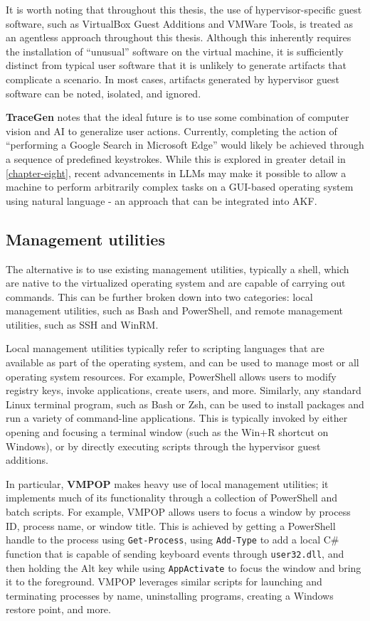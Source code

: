 \documentclass[letterpaper,12pt]{report}
\newcommand{\passthrough}[1]{#1}
\begin{document}
It is worth noting that throughout this thesis, the use of
hypervisor-specific guest software, such as VirtualBox Guest Additions
and VMWare Tools, is treated as an agentless approach throughout this
thesis. Although this inherently requires the installation of
``unusual'' software on the virtual machine, it is sufficiently distinct
from typical user software that it is unlikely to generate artifacts
that complicate a scenario. In most cases, artifacts generated by
hypervisor guest software can be noted, isolated, and ignored.

\textbf{TraceGen} notes that the ideal future is to use some combination
of computer vision and AI to generalize user actions. Currently,
completing the action of ``performing a Google Search in Microsoft
Edge'' would likely be achieved through a sequence of predefined
keystrokes. While this is explored in greater detail in \autoref{chapter-eight}, recent advancements in LLMs may make it possible to allow
a machine to perform arbitrarily complex tasks on a GUI-based operating
system using natural language - an approach that can be integrated into
AKF.

\subsection{Management utilities}\label{management-utilities}

The alternative is to use existing management utilities, typically a
shell, which are native to the virtualized operating system and are
capable of carrying out commands. This can be further broken down into
two categories: local management utilities, such as Bash and PowerShell,
and remote management utilities, such as SSH and WinRM.

Local management utilities typically refer to scripting languages that
are available as part of the operating system, and can be used to manage
most or all operating system resources. For example, PowerShell allows
users to modify registry keys, invoke applications, create users, and
more. Similarly, any standard Linux terminal program, such as Bash or
Zsh, can be used to install packages and run a variety of command-line
applications. This is typically invoked by either opening and focusing a
terminal window (such as the Win+R shortcut on Windows), or by directly
executing scripts through the hypervisor guest additions.

In particular, \textbf{VMPOP} makes heavy use of local management
utilities; it implements much of its functionality through a collection
of PowerShell and batch scripts. For example, VMPOP allows users to
focus a window by process ID, process name, or window title. This is
achieved by getting a PowerShell handle to the process using
\passthrough{\lstinline!Get-Process!}, using
\passthrough{\lstinline!Add-Type!} to add a local C\# function that is
capable of sending keyboard events through
\passthrough{\lstinline!user32.dll!}, and then holding the Alt key while
using \passthrough{\lstinline!AppActivate!} to focus the window and
bring it to the foreground. VMPOP leverages similar scripts for
launching and terminating processes by name, uninstalling programs,
creating a Windows restore point, and more.
\end{document}
